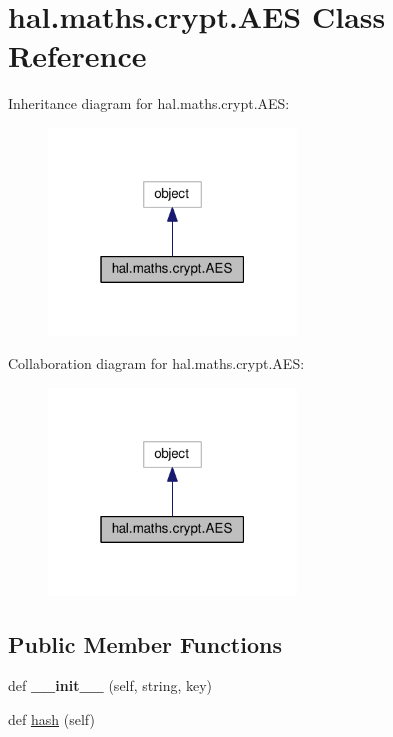 \hypertarget{classhal_1_1maths_1_1crypt_1_1_a_e_s}{}\section{hal.\+maths.\+crypt.\+A\+ES Class Reference}
\label{classhal_1_1maths_1_1crypt_1_1_a_e_s}


Inheritance diagram for hal.\+maths.\+crypt.\+A\+ES\+:\nopagebreak
\begin{figure}[H]
\begin{center}
\leavevmode
\includegraphics[width=187pt]{classhal_1_1maths_1_1crypt_1_1_a_e_s__inherit__graph}
\end{center}
\end{figure}


Collaboration diagram for hal.\+maths.\+crypt.\+A\+ES\+:\nopagebreak
\begin{figure}[H]
\begin{center}
\leavevmode
\includegraphics[width=187pt]{classhal_1_1maths_1_1crypt_1_1_a_e_s__coll__graph}
\end{center}
\end{figure}
\subsection*{Public Member Functions}
\begin{DoxyCompactItemize}
\item 
def {\bfseries \+\_\+\+\_\+init\+\_\+\+\_\+} (self, string, key)\hypertarget{classhal_1_1maths_1_1crypt_1_1_a_e_s_a384607218f6de8a5bf2091a8913f02a2}{}\label{classhal_1_1maths_1_1crypt_1_1_a_e_s_a384607218f6de8a5bf2091a8913f02a2}

\item 
def \hyperlink{classhal_1_1maths_1_1crypt_1_1_a_e_s_ab7bd23c02bda2da94f6a2437f906cd09}{hash} (self)
\end{DoxyCompactItemize}
